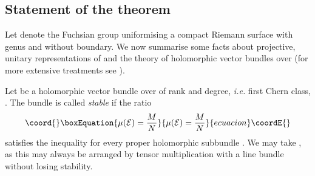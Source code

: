 \documentclass[a4paper,a4paper]{article}
\begin{document}
\subsection{Statement of the theorem}\label{useful}  
  
Let \myHighlight{$\Gamma$}\coordHE{} denote the Fuchsian group uniformising a compact 
Riemann surface \myHighlight{$\Sigma$}\coordHE{} with genus \coordHE{} and without boundary. 
We now summarise some facts about projective, unitary representations 
of \myHighlight{$\Gamma$}\coordHE{} and the theory of holomorphic vector bundles over \myHighlight{$\Sigma$}\coordHE{} 
\cite{NASE} (for more extensive treatments see \cite{KOBAYASHI, ABZT}).

Let \coordHE{}  be a holomorphic vector bundle over \myHighlight{$\Sigma$}\coordHE{} 
of rank \coordHE{} and degree, {\it i.e.} first Chern class, \coordHE{}. The bundle \coordHE{} 
is called {\it stable} if the ratio  
\begin{equation}\coord{}\boxEquation{  
\mu({\cal  E})={M\over N}  
\label{ratio}  
}{  
\mu({\cal  E})={M\over N}  
}{ecuacion}\coordE{}\end{equation}  
satisfies the inequality  
\coordHE{} for every proper holomorphic subbundle   
\coordHE{}. We may take \coordHE{}, as this may always 
be arranged by tensor multiplication with a line bundle without losing stability. 
\end{document}
